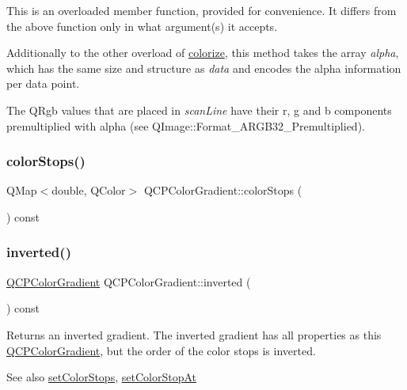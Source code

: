This is an overloaded member function, provided for convenience. It differs from the above function only in what argument(s) it accepts.

Additionally to the other overload of \mbox{\hyperlink{class_q_c_p_color_gradient_aaf423ceb943e177b0ed2c48c811d83dc}{colorize}}, this method takes the array {\itshape alpha}, which has the same size and structure as {\itshape data} and encodes the alpha information per data point.

The Q\+Rgb values that are placed in {\itshape scan\+Line} have their r, g and b components premultiplied with alpha (see Q\+Image\+::\+Format\+\_\+\+A\+R\+G\+B32\+\_\+\+Premultiplied). \mbox{\label{class_q_c_p_color_gradient_aaab19729e921682401044ac8e518ff02}} 
\subsubsection{\texorpdfstring{colorStops()}{colorStops()}}
{\footnotesize\ttfamily Q\+Map$<$double, Q\+Color$>$ Q\+C\+P\+Color\+Gradient\+::color\+Stops (\begin{DoxyParamCaption}{ }\end{DoxyParamCaption}) const\hspace{0.3cm}{\ttfamily [inline]}}

\mbox{\label{class_q_c_p_color_gradient_a9f72f501de429829ec446333316decda}} 
\subsubsection{\texorpdfstring{inverted()}{inverted()}}
{\footnotesize\ttfamily \mbox{\hyperlink{class_q_c_p_color_gradient}{Q\+C\+P\+Color\+Gradient}} Q\+C\+P\+Color\+Gradient\+::inverted (\begin{DoxyParamCaption}{ }\end{DoxyParamCaption}) const}

Returns an inverted gradient. The inverted gradient has all properties as this \mbox{\hyperlink{class_q_c_p_color_gradient}{Q\+C\+P\+Color\+Gradient}}, but the order of the color stops is inverted.

\begin{DoxySeeAlso}{See also}
\mbox{\hyperlink{class_q_c_p_color_gradient_a724e828aa6f0ba5011a9392477c35d3a}{set\+Color\+Stops}}, \mbox{\hyperlink{class_q_c_p_color_gradient_a3b48be5e78079db1bb2a1188a4c3390e}{set\+Color\+Stop\+At}} 
\end{DoxySeeAlso}
\mbox{\label{class_q_c_p_color_gradient_ac4b9d7034fc3b6c76318b05075367090}} 
